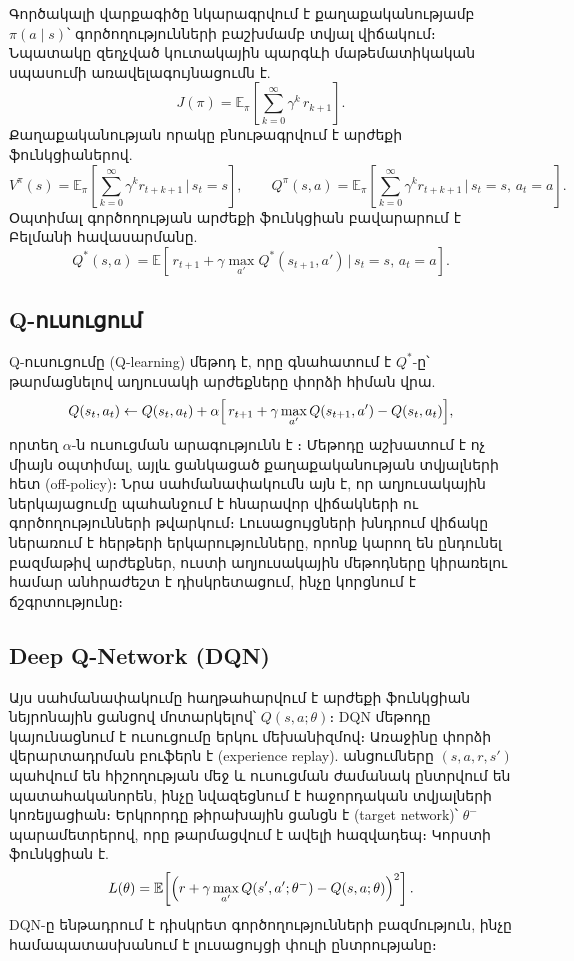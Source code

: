 \documentclass[12pt,a4paper]{extreport}
\begin{document}
Գործակալի վարքագիծը նկարագրվում է քաղաքականությամբ $\pi(a \mid s)$՝ գործողությունների բաշխմամբ տվյալ վիճակում։ Նպատակը զեղչված կուտակային պարգևի մաթեմատիկական սպասումի առավելագույնացումն է.
\begin{equation}
  J(\pi) = \mathbb{E}_{\pi}\!\left[\sum_{k=0}^{\infty} \gamma^{k}\, r_{k+1}\right].
\end{equation}
Քաղաքականության որակը բնութագրվում է արժեքի ֆունկցիաներով.
\begin{equation}
  V^{\pi}(s) = \mathbb{E}_{\pi}\!\left[\sum_{k=0}^{\infty} \gamma^{k} r_{t+k+1} \,\Big|\, s_t = s\right],
  \qquad
  Q^{\pi}(s,a) = \mathbb{E}_{\pi}\!\left[\sum_{k=0}^{\infty} \gamma^{k} r_{t+k+1} \,\Big|\, s_t = s,\, a_t = a\right].
\end{equation}
Օպտիմալ գործողության արժեքի ֆունկցիան բավարարում է Բելմանի հավասարմանը.
\begin{equation}
  Q^{*}(s,a) = \mathbb{E}\!\left[\, r_{t+1} + \gamma \max_{a'} Q^{*}(s_{t+1}, a') \,\Big|\, s_t = s,\, a_t = a \right].
\end{equation}

\subsection{Q-ուսուցում}

Q-ուսուցումը (Q-learning) մեթոդ է, որը գնահատում է $Q^{*}$-ը՝ թարմացնելով աղյուսակի արժեքները փորձի հիման վրա.
\begin{equation}
  Q(s_t, a_t) \leftarrow Q(s_t, a_t) + \alpha\Bigl[\, r_{t+1} + \gamma \max_{a'} Q(s_{t+1}, a') - Q(s_t, a_t) \Bigr],
\end{equation}
որտեղ $\alpha$-ն ուսուցման արագությունն է \cite{watkins1989}։ Մեթոդը աշխատում է ոչ միայն օպտիմալ, այլև ցանկացած քաղաքականության տվյալների հետ (off-policy)։ Նրա սահմանափակումն այն է, որ աղյուսակային ներկայացումը պահանջում է հնարավոր վիճակների ու գործողությունների թվարկում։ Լուսացույցների խնդրում վիճակը ներառում է հերթերի երկարությունները, որոնք կարող են ընդունել բազմաթիվ արժեքներ, ուստի աղյուսակային մեթոդները կիրառելու համար անհրաժեշտ է դիսկրետացում, ինչը կորցնում է ճշգրտությունը։

\subsection{Deep Q-Network (DQN)}

Այս սահմանափակումը հաղթահարվում է արժեքի ֆունկցիան նեյրոնային ցանցով մոտարկելով՝ $Q(s,a;\theta)$։ DQN մեթոդը \cite{mnih2015} կայունացնում է ուսուցումը երկու մեխանիզմով։ Առաջինը փորձի վերարտադրման բուֆերն է (experience replay). անցումները $(s,a,r,s')$ պահվում են հիշողության մեջ և ուսուցման ժամանակ ընտրվում են պատահականորեն, ինչը նվազեցնում է հաջորդական տվյալների կոռելյացիան։ Երկրորդը թիրախային ցանցն է (target network)՝ $\theta^{-}$ պարամետրերով, որը թարմացվում է ավելի հազվադեպ։ Կորստի ֆունկցիան է.
\begin{equation}
  L(\theta) = \mathbb{E}\!\left[\Bigl(r + \gamma \max_{a'} Q(s', a'; \theta^{-}) - Q(s, a; \theta)\Bigr)^{2}\right].
\end{equation}
DQN-ը ենթադրում է դիսկրետ գործողությունների բազմություն, ինչը համապատասխանում է լուսացույցի փուլի ընտրությանը։
\end{document}
